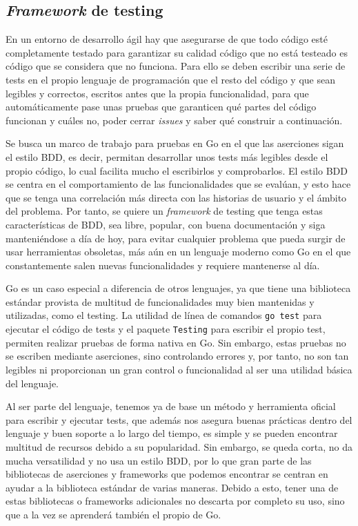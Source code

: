 \subsection{\textit{Framework} de testing} En un entorno de desarrollo ágil hay
que asegurarse de que todo código esté completamente testado para garantizar su
calidad código que no está testeado es código que se considera que no funciona.
Para ello se deben escribir una serie de tests en el propio lenguaje de
programación que el resto del código y que sean legibles y correctos, escritos
antes que la propia funcionalidad, para que automáticamente pase unas pruebas
que garanticen qué partes del código funcionan y cuáles no, poder cerrar
\textit{issues} y saber qué construir a continuación.

Se busca un marco de trabajo para pruebas en Go en el que las aserciones sigan
el estilo BDD, es decir, permitan desarrollar unos tests más legibles desde el
propio código, lo cual facilita mucho el escribirlos y comprobarlos. El estilo
BDD se centra en el comportamiento de las funcionalidades que se evalúan, y esto
hace que se tenga una correlación más directa con las historias de usuario y el
ámbito del problema. Por tanto, se quiere un \textit{framework} de testing que
tenga estas características de BDD, sea libre, popular, con buena documentación
y siga manteniéndose a día de hoy, para evitar cualquier problema que pueda
surgir de usar herramientas obsoletas, más aún en un lenguaje moderno como Go en
el que constantemente salen nuevas funcionalidades y requiere mantenerse al día.

Go es un caso especial a diferencia de otros lenguajes, ya que tiene una
biblioteca estándar provista de multitud de funcionalidades muy bien mantenidas
y utilizadas, como el testing. La utilidad de línea de comandos \texttt{go test}
para ejecutar el código de tests y el paquete \texttt{Testing} para escribir el
propio test, permiten realizar pruebas de forma nativa en Go. Sin embargo, estas
pruebas no se escriben mediante aserciones, sino controlando errores y, por
tanto, no son tan legibles ni proporcionan un gran control o funcionalidad al
ser una utilidad básica del lenguaje.

Al ser parte del lenguaje, tenemos ya de base un método y herramienta oficial
para escribir y ejecutar tests, que además nos asegura buenas prácticas dentro
del lenguaje y buen soporte a lo largo del tiempo, es simple y se pueden
encontrar multitud de recursos debido a su popularidad. Sin embargo, se queda
corta, no da mucha versatilidad y no usa un estilo BDD, por lo que gran parte de
las bibliotecas de aserciones y frameworks que podemos encontrar se centran en
ayudar a la biblioteca estándar de varias maneras. Debido a esto, tener una de
estas bibliotecas o frameworks adicionales no descarta por completo su uso, sino
que a la vez se aprenderá también el propio de Go.

